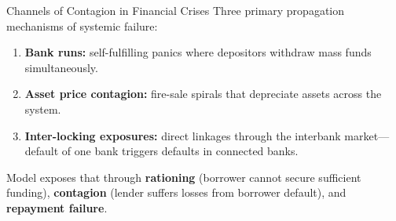 \begin{frame}{Channels of Contagion in Financial Crises}
  Three primary propagation mechanisms of systemic failure:
  \begin{enumerate}
    \item \textbf{Bank runs:} self-fulfilling panics where depositors withdraw mass funds simultaneously.
    \item \textbf{Asset price contagion:} fire-sale spirals that depreciate assets across the system.
    \item \textbf{Inter-locking exposures:} direct linkages through the interbank market---default of one bank triggers defaults in connected banks.
  \end{enumerate}
  \vspace{0.3cm}
  Model exposes that through \textbf{rationing} (borrower cannot secure sufficient funding), \textbf{contagion} (lender suffers losses from borrower default), and \textbf{repayment failure}.
\end{frame}


